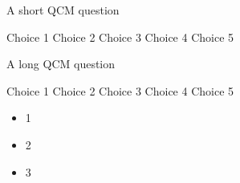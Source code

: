 \documentclass[11pt,addpoints]{exam}
\begin{document}
\begin{questions}
	\question[2] A short QCM question
	
	\begin{oneparchoices}
		\choice Choice 1
		\choice Choice 2
		\choice Choice 3
		\choice Choice 4
		\choice Choice 5
	\end{oneparchoices}

		\question A long QCM question
	
	\begin{choices}
		\choice Choice 1
		\choice Choice 2
		\choice Choice 3
		\choice Choice 4
		\choice Choice 5
	\end{choices}
\end{questions}

\begin{itemize}
	\item 1 \item 2 \item 3
\end{itemize}
\end{document}
